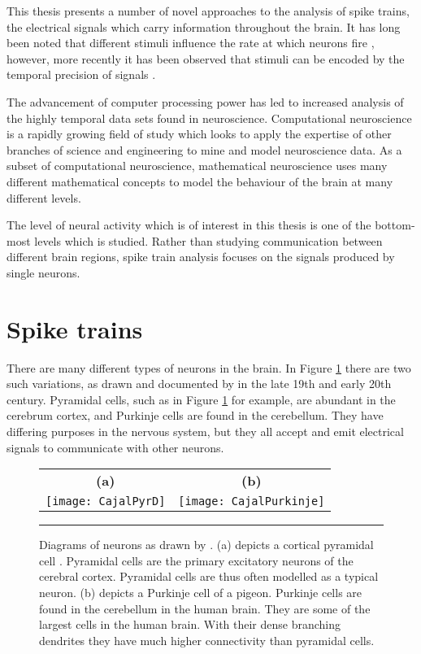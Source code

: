 This thesis presents a number of novel approaches to the analysis of spike trains, the electrical signals which carry information throughout the brain. It has long been noted that different stimuli influence the rate at which neurons fire \citep{Knight1972a}, however, more recently it has been observed that stimuli can be encoded by the temporal precision of signals \citep{HopkinsBass1981a,EngelEtAl1992a}.
 
The advancement of computer processing power has led to increased analysis of the highly temporal data sets found in neuroscience. Computational neuroscience is a rapidly growing field of study which looks to apply the expertise of other branches of science and engineering to mine and model neuroscience data.  As a subset of computational neuroscience, mathematical neuroscience uses many different mathematical concepts to model the behaviour of the brain at many different levels.
 
The level of neural activity which is of interest in this thesis is one of the bottom-most levels which is studied.  Rather than studying communication between different brain regions, spike train analysis focuses on the signals produced by single neurons.


\section{Spike trains}

There are many different types of neurons in the brain. In Figure \ref{Cajal} there are two such variations, as drawn and documented by \citet{Cajal1904a} in the late 19th and early 20th century. Pyramidal cells, such as in Figure \ref{Cajal} for example, are abundant in the cerebrum cortex, and Purkinje cells are found in the cerebellum.  They have differing purposes in the nervous system, but they all accept and emit electrical signals to communicate with other neurons.

\begin{figure}
\begin{center}
\begin{tabular}{cc}
{\bf (a)} & {\bf (b)} \\
\texttt{[image: CajalPyrD]} & \texttt{[image: CajalPurkinje]}
\end{tabular}
\bigskip
\rule{31.5em}{0.5pt}
\caption{\label{Cajal} Diagrams of neurons as drawn by \citet{Cajal1904a}.  (a) depicts a cortical pyramidal cell .  Pyramidal cells are the primary excitatory neurons of the cerebral cortex.  Pyramidal cells are thus often modelled as a typical neuron.  (b) depicts a Purkinje cell of a pigeon.  Purkinje cells are found in the cerebellum in the human brain. They are some of the largest cells in the human brain. With their dense branching dendrites they have much higher connectivity than pyramidal cells.}
\end{center}
\end{figure} 

